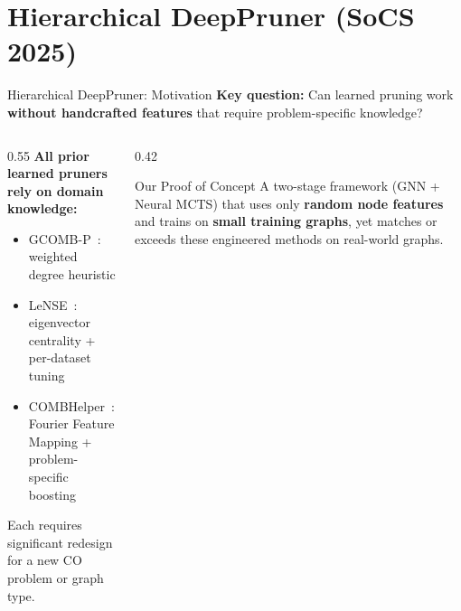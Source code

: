 \documentclass[aspectratio=169,xcolor=dvipsnames,8pt]{beamer}
\begin{document}




\section{Hierarchical DeepPruner (SoCS 2025)}

\begin{frame}{Hierarchical DeepPruner: Motivation}
  \textbf{Key question:} Can learned pruning work \textbf{without handcrafted features}
  that require problem-specific knowledge?

  \vspace{0.3cm}

  \begin{columns}[T]
    \begin{column}{0.55\textwidth}
      \textbf{All prior learned pruners rely on domain knowledge:}
      \begin{itemize}
        \item GCOMB-P~\cite{manchanda2020gcomb}: weighted degree heuristic
        \item LeNSE~\cite{ireland2022lense}: eigenvector centrality +
          per-dataset tuning
        \item COMBHelper~\cite{tian2024combhelper}: Fourier Feature Mapping +
          problem-specific boosting
      \end{itemize}
      Each requires significant redesign for a new CO problem or graph type.
    \end{column}
    \begin{column}{0.42\textwidth}
      \begin{block}{Our Proof of Concept}
        A two-stage framework (GNN + Neural MCTS) that uses only
        \textbf{random node features} and trains on \textbf{small training graphs},
        yet matches or exceeds these engineered methods on real-world graphs.
      \end{block}
    \end{column}
  \end{columns}
\end{frame}
\end{document}
